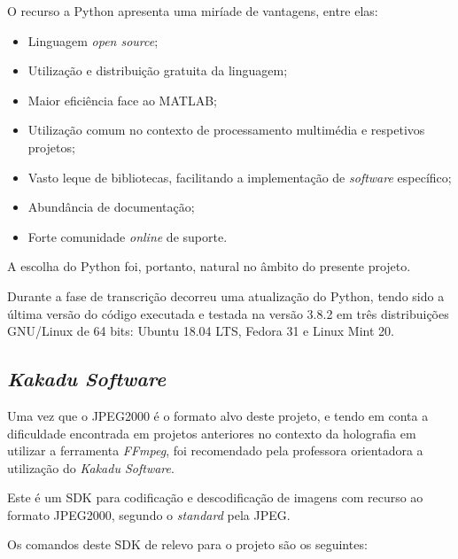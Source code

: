 
O recurso a Python apresenta uma miríade de vantagens, entre elas:
\begin{itemize}
    \item Linguagem \textit{open source};
    \item Utilização e distribuição gratuita da linguagem;
    \item Maior eficiência face ao MATLAB;
    \item Utilização comum no contexto de processamento multimédia e respetivos projetos;
    \item Vasto leque de bibliotecas, facilitando a implementação de \textit{software} específico;
    \item Abundância de documentação;
    \item Forte comunidade \textit{online} de suporte.
\end{itemize}

A escolha do Python foi, portanto, natural no âmbito do presente projeto.

Durante a fase de transcrição decorreu uma atualização do Python, tendo sido a última versão do código executada e testada na versão 3.8.2 em três distribuições GNU/Linux de 64 bits: Ubuntu 18.04 LTS, Fedora 31 e Linux Mint 20.

\subsection{\textit{Kakadu Software}}
\label{ssec::tecno-ferr:tecno-ferr:kdu}
Uma vez que o JPEG2000 é o formato alvo deste projeto, e tendo em conta a dificuldade encontrada em projetos anteriores no contexto da holografia em utilizar a ferramenta \textit{FFmpeg}, foi recomendado pela professora orientadora a utilização do \textit{Kakadu Software}\cite{kakadu}.

Este é um \ac{SDK} para codificação e descodificação de imagens com recurso ao formato JPEG2000, segundo o \textit{standard} pela \ac{JPEG}.

Os comandos deste \ac{SDK} de relevo para o projeto são os seguintes:

